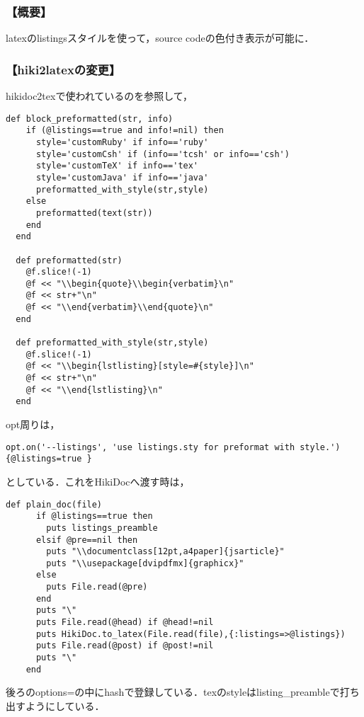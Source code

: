 \subsubsection{【概要】}
latexのlistingsスタイルを使って，source codeの色付き表示が可能に．

\subsubsection{【hiki2latexの変更】}
hikidoc2texで使われているのを参照して，
\begin{lstlisting}[style=customRuby]
  def block_preformatted(str, info)
    if (@listings==true and info!=nil) then
      style='customRuby' if info=='ruby'
      style='customCsh' if (info=='tcsh' or info=='csh')
      style='customTeX' if info=='tex'
      style='customJava' if info=='java'
      preformatted_with_style(str,style)
    else
      preformatted(text(str))
    end
  end

  def preformatted(str)
    @f.slice!(-1)
    @f << "\\begin{quote}\\begin{verbatim}\n"
    @f << str+"\n"
    @f << "\\end{verbatim}\\end{quote}\n"
  end

  def preformatted_with_style(str,style)
    @f.slice!(-1)
    @f << "\\begin{lstlisting}[style=#{style}]\n"
    @f << str+"\n"
    @f << "\\end{lstlisting}\n"
  end
\end{lstlisting}
opt周りは，
\begin{lstlisting}[style=customRuby]
        opt.on('--listings', 'use listings.sty for preformat with style.') {@listings=true }
\end{lstlisting}
としている．これをHikiDocへ渡す時は，
\begin{lstlisting}[style=customRuby]
    def plain_doc(file)
      if @listings==true then
        puts listings_preamble
      elsif @pre==nil then
        puts "\\documentclass[12pt,a4paper]{jsarticle}"
        puts "\\usepackage[dvipdfmx]{graphicx}"
      else
        puts File.read(@pre)
      end
      puts "\"
      puts File.read(@head) if @head!=nil
      puts HikiDoc.to_latex(File.read(file),{:listings=>@listings})
      puts File.read(@post) if @post!=nil
      puts "\"
    end
\end{lstlisting}
後ろのoptions={}の中にhashで登録している．texのstyleはlisting\_preambleで打ち出すようにしている．

